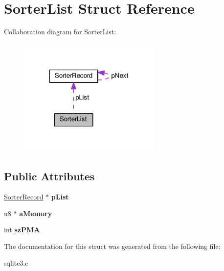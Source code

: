 \hypertarget{structSorterList}{}\section{Sorter\+List Struct Reference}
\label{structSorterList}


Collaboration diagram for Sorter\+List\+:\nopagebreak
\begin{figure}[H]
\begin{center}
\leavevmode
\includegraphics[width=202pt]{structSorterList__coll__graph}
\end{center}
\end{figure}
\subsection*{Public Attributes}
\begin{DoxyCompactItemize}
\item 
\hyperlink{structSorterRecord}{Sorter\+Record} $\ast$ {\bfseries p\+List}\hypertarget{structSorterList_a913640b1b917acccd7a851483f9d4e2b}{}\label{structSorterList_a913640b1b917acccd7a851483f9d4e2b}

\item 
u8 $\ast$ {\bfseries a\+Memory}\hypertarget{structSorterList_ae0c7c3714fd8c61b806a5767ce686344}{}\label{structSorterList_ae0c7c3714fd8c61b806a5767ce686344}

\item 
int {\bfseries sz\+P\+MA}\hypertarget{structSorterList_a4d14b7e48b155f6b79dd6fd37645b73c}{}\label{structSorterList_a4d14b7e48b155f6b79dd6fd37645b73c}

\end{DoxyCompactItemize}


The documentation for this struct was generated from the following file\+:\begin{DoxyCompactItemize}
\item 
sqlite3.\+c\end{DoxyCompactItemize}

